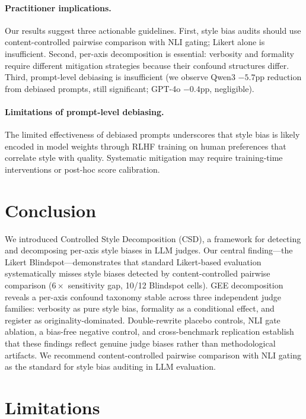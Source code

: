 \documentclass[11pt]{article}
\begin{document}
\paragraph{Practitioner implications.}
Our results suggest three actionable guidelines.
First, style bias audits should use content-controlled pairwise comparison with NLI gating; Likert alone is insufficient.
Second, per-axis decomposition is essential: verbosity and formality require different mitigation strategies because their confound structures differ.
Third, prompt-level debiasing is insufficient (we observe Qwen3 $-5.7$pp reduction from debiased prompts, still significant; GPT-4o $-0.4$pp, negligible).

\paragraph{Limitations of prompt-level debiasing.}
The limited effectiveness of debiased prompts underscores that style bias is likely encoded in model weights through RLHF training on human preferences that correlate style with quality.
Systematic mitigation may require training-time interventions or post-hoc score calibration.

\section{Conclusion}
\label{sec:conclusion}

We introduced Controlled Style Decomposition (CSD), a framework for detecting and decomposing per-axis style biases in LLM judges.
Our central finding---the Likert Blindspot---demonstrates that standard Likert-based evaluation systematically misses style biases detected by content-controlled pairwise comparison ($6\times$ sensitivity gap, 10/12 Blindspot cells).
GEE decomposition reveals a per-axis confound taxonomy stable across three independent judge families: verbosity as pure style bias, formality as a conditional effect, and register as originality-dominated.
Double-rewrite placebo controls, NLI gate ablation, a bias-free negative control, and cross-benchmark replication establish that these findings reflect genuine judge biases rather than methodological artifacts.
We recommend content-controlled pairwise comparison with NLI gating as the standard for style bias auditing in LLM evaluation.

\section*{Limitations}
\label{sec:limitations}
\end{document}
